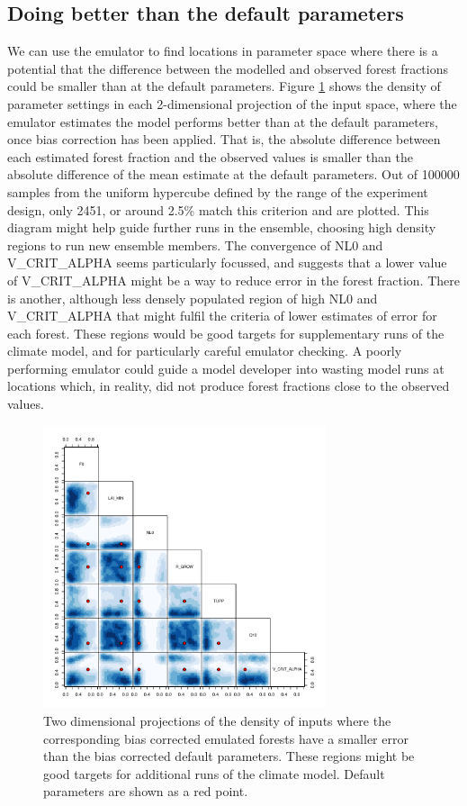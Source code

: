 \documentclass[gmd, manuscript]{copernicus}
\begin{document}
\subsection{Doing better than the default parameters}\label{ssec:better_than_default}
We can use the emulator to find locations in parameter space where there is a potential that the difference between the modelled and observed forest fractions could be smaller than at the default parameters. Figure \ref{fig:smaller_error_bc_default} shows the density of parameter settings in each 2-dimensional projection of the input space, where the emulator estimates the model performs better than at the default parameters, once bias correction has been applied. That is, the absolute difference between each estimated forest fraction and the observed values is smaller than the absolute difference of the mean estimate at the default parameters. Out of 100000 samples from the uniform hypercube defined by the range of the experiment design, only 2451, or around 2.5\% match this criterion and are plotted. This diagram might help guide further runs in the ensemble, choosing high density regions to run new ensemble members. The convergence of NL0 and V\_CRIT\_ALPHA seems particularly focussed, and suggests that a lower value of V\_CRIT\_ALPHA might be a way to reduce error in the forest fraction. There is another, although less densely populated region of high NL0 and V\_CRIT\_ALPHA that might fulfil the criteria of lower estimates of error for each forest. These regions would be good targets for supplementary runs of the climate model, and for particularly careful emulator checking. A poorly performing emulator could guide a model developer into wasting model runs at locations which, in reality, did not produce forest fractions close to the observed values.


\begin{figure}[t]
\includegraphics[width=8.3cm]{../graphics/smaller_error_bc_default.pdf}
\caption{Two dimensional projections of the density of inputs where the corresponding bias corrected emulated forests have a smaller error than the bias corrected default parameters. These regions might be good targets for additional runs of the climate model. Default parameters are shown as a red point.
}
\label{fig:smaller_error_bc_default}
\end{figure}
\end{document}
